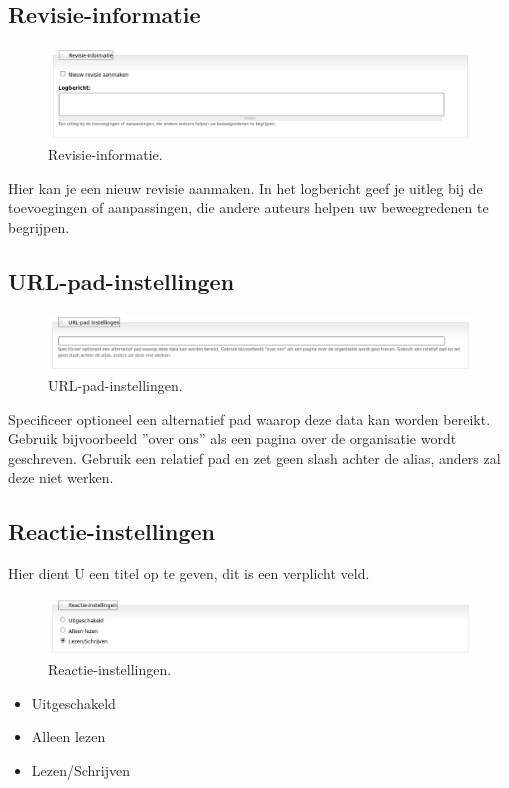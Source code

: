 \subsection{Revisie-informatie} 
 \begin{figure}[!h]
    \centering
   \includegraphics[scale=0.3,angle=0]{revisie-informatie}
   \caption{Revisie-informatie.\label{white}}
 \end{figure}
Hier kan je een nieuw revisie aanmaken. In het logbericht geef je uitleg
bij de toevoegingen of aanpassingen, die andere auteurs helpen uw beweegredenen te begrijpen.

\subsection{URL-pad-instellingen} 
 \begin{figure}[!h]
    \centering
   \includegraphics[scale=0.3,angle=0]{url-pad-instellingen}
   \caption{URL-pad-instellingen.\label{white}}
 \end{figure}
Specificeer optioneel een alternatief pad waarop deze data kan worden bereikt.
Gebruik bijvoorbeeld ''over ons'' als een pagina over de organisatie wordt
geschreven. Gebruik een relatief pad en zet geen slash achter de alias, anders zal deze niet werken.

\subsection{Reactie-instellingen} 
Hier dient U een titel op te geven, dit is een verplicht veld.
 \begin{figure}[!h]
    \centering
   \includegraphics[scale=0.3,angle=0]{reactie-instellingen}
   \caption{Reactie-instellingen.\label{white}}
 \end{figure}
\begin{itemize}
  \item Uitgeschakeld
  \item Alleen lezen
  \item Lezen/Schrijven
\end{itemize}

